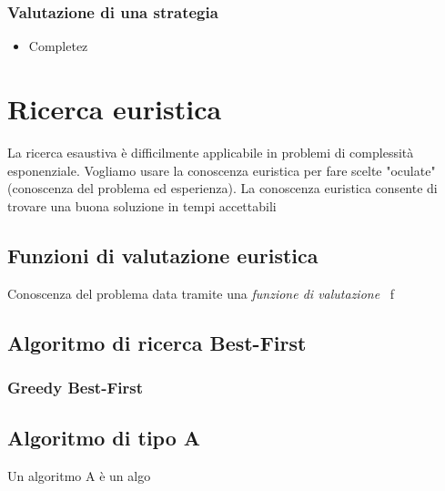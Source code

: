 \documentclass{article}
\begin{document}
\subsubsection{Valutazione di una strategia}
\begin{itemize}
    \item Completez
\end{itemize}



\section{Ricerca euristica}
La ricerca esaustiva è difficilmente applicabile in problemi di complessità esponenziale. Vogliamo usare la conoscenza euristica per fare scelte "oculate" (conoscenza del problema ed esperienza).
La conoscenza euristica consente di trovare una buona soluzione in tempi accettabili

\subsection{Funzioni di valutazione euristica}
Conoscenza del problema data tramite una \textit{funzione di valutazione} \ f\  

\subsection{Algoritmo di ricerca Best-First}
\subsubsection{Greedy Best-First}
\subsection{Algoritmo di tipo A}
Un algoritmo A è un algo
\end{document}
